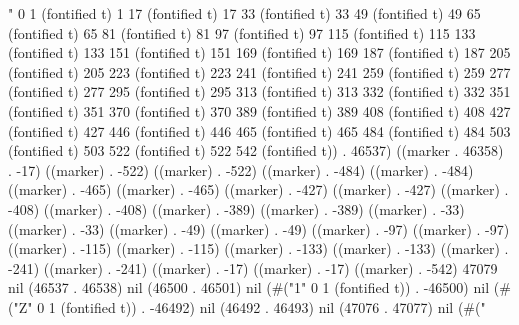 " 0 1 (fontified t) 1 17 (fontified t) 17 33 (fontified t) 33 49 (fontified t) 49 65 (fontified t) 65 81 (fontified t) 81 97 (fontified t) 97 115 (fontified t) 115 133 (fontified t) 133 151 (fontified t) 151 169 (fontified t) 169 187 (fontified t) 187 205 (fontified t) 205 223 (fontified t) 223 241 (fontified t) 241 259 (fontified t) 259 277 (fontified t) 277 295 (fontified t) 295 313 (fontified t) 313 332 (fontified t) 332 351 (fontified t) 351 370 (fontified t) 370 389 (fontified t) 389 408 (fontified t) 408 427 (fontified t) 427 446 (fontified t) 446 465 (fontified t) 465 484 (fontified t) 484 503 (fontified t) 503 522 (fontified t) 522 542 (fontified t)) . 46537) ((marker . 46358) . -17) ((marker) . -522) ((marker) . -522) ((marker) . -484) ((marker) . -484) ((marker) . -465) ((marker) . -465) ((marker) . -427) ((marker) . -427) ((marker) . -408) ((marker) . -408) ((marker) . -389) ((marker) . -389) ((marker) . -33) ((marker) . -33) ((marker) . -49) ((marker) . -49) ((marker) . -97) ((marker) . -97) ((marker) . -115) ((marker) . -115) ((marker) . -133) ((marker) . -133) ((marker) . -241) ((marker) . -241) ((marker) . -17) ((marker) . -17) ((marker) . -542) 47079 nil (46537 . 46538) nil (46500 . 46501) nil (#("1" 0 1 (fontified t)) . -46500) nil (#("Z" 0 1 (fontified t)) . -46492) nil (46492 . 46493) nil (47076 . 47077) nil (#("%